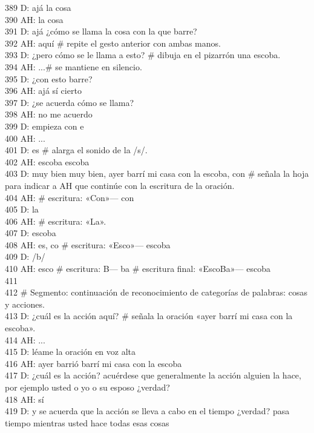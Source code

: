 389 D: ajá la cosa\\
390 AH: la cosa\\
391 D: ajá ¿cómo se llama la cosa con la que barre?\\
392 AH: aquí \# repite el gesto anterior con ambas manos.\\
393 D: ¿pero cómo se le llama a esto? \# dibuja en el pizarrón una escoba.\\
394 AH: ...\# se mantiene en silencio.\\
395 D: ¿con esto barre?\\
396 AH: ajá sí cierto\\
397 D: ¿se acuerda cómo se llama?\\
398 AH: no me acuerdo\\
399 D: empieza con e\\
400 AH: ...\\
401 D: es \# alarga el sonido de la /s/.\\
402 AH: escoba escoba\\
403 D: muy bien muy bien, ayer barrí mi casa con la escoba, con \# señala la hoja para indicar a AH que continúe con la escritura de la oración.\\
404 AH: \# escritura: «Con»--- con\\
405 D: la\\
406 AH: \# escritura: «La».\\
407 D: escoba\\
408 AH: es, co \# escritura: «Esco»--- escoba\\
409 D: /b/\\
410 AH: esco \# escritura: B--- ba \# escritura final: «EscoBa»--- escoba\\
411 \\
412 \# Segmento: continuación de reconocimiento de categorías de palabras: cosas y acciones.\\
413 D: ¿cuál es la acción aquí? \# señala la oración «ayer barrí mi casa con la escoba».\\
414 AH: ...\\
415 D: léame la oración en voz alta\\
416 AH: ayer barrió barrí mi casa con la escoba\\
417 D: ¿cuál es la acción? acuérdese que generalmente la acción alguien la hace, por ejemplo usted o yo o su esposo ¿verdad?\\
418 AH: sí\\
419 D: y se acuerda que la acción se lleva a cabo en el tiempo ¿verdad? pasa tiempo mientras usted hace todas esas cosas\\
